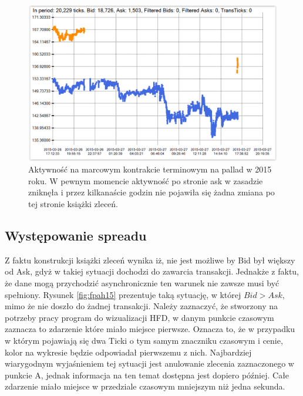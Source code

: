\documentclass[a4paper,12pt,openany, DIV=calc, headsepline]{scrbook}
\begin{document}
\begin{figure}[H]
  \centering
  \includegraphics[scale=0.5]{wykresy/fplh15.PNG}
  \caption{Aktywność na marcowym kontrakcie terminowym na pallad w 2015 roku. W pewnym momencie aktywność po stronie ask w zasadzie zniknęła i przez kilkanaście godzin nie pojawiła się żadna zmiana po tej stronie książki zleceń.}
  \label{fig:fplh15}
\end{figure}

\subsection{Występowanie spreadu}

Z faktu konstrukcji książki zleceń wynika iż, nie jest możliwe by Bid był większy od Ask, gdyż w takiej sytuacji dochodzi do zawarcia transakcji. Jednakże z faktu, że dane mogą przychodzić asynchronicznie ten warunek nie zawsze musi być spełniony. Rysunek \ref{fig:fpah15} prezentuje taką sytuację, w której $Bid > Ask$, mimo że nie doszło do żadnej transakcji. Należy zaznaczyć, że stworzony na potrzeby pracy program do wizualizacji HFD, w danym punkcie czasowym zaznacza to zdarzenie które miało miejsce pierwsze. Oznacza to, że w przypadku w którym pojawiają się dwa Ticki o tym samym znaczniku czasowym i cenie, kolor na wykresie będzie odpowiadał pierwszemu z nich. Najbardziej wiarygodnym wyjaśnieniem tej sytuacji jest anulowanie zlecenia zaznaczonego w punkcie A, jednak informacja na ten temat dostępna jest dopiero później. Całe zdarzenie miało miejsce w przedziale czasowym mniejszym niż jedna sekunda.
\end{document}
